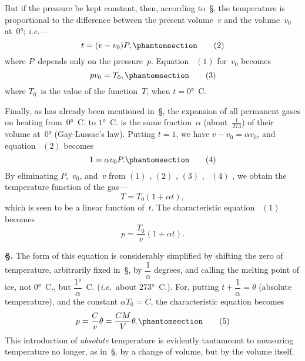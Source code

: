 \documentclass[12pt]{book}[2005/09/16]
\newcommand{\Chg}[2]{#2}
\newcommand{\Add}[1]{\Chg{}{#1}}
\newcommand{\Section}[1]{
  \medskip\par\textbf{§\;#1}
  \label{section:#1}
}
\newcommand{\SecRef}[2][§\;]{\hyperref[section:#2.]{{\upshape #1#2}}}
\newcommand{\Tag}[1]{%
  \phantomsection\label{eqn:#1}\tag*{\ensuremath{#1}}%
}
\newcommand{\Eq}[1]{%
  \hyperref[eqn:#1]{\ensuremath{#1}}%
}
\newcommand{\PageSep}[1]{\ignorespaces}
\newcommand{\ie}{\emph{i.e.}}
\begin{document}
But if the pressure be kept constant, then, according to~\SecRef{3},
the temperature is proportional to the difference between
the present volume~$v$ and the volume~$v_{0}$ at~$0°$; \ie---
\[
t = (v - v_{0})P,
\Tag{(2)}
\]
where $P$~depends only on the pressure~$p$. Equation~\Eq{(1)} for~$v_{0}$
becomes
\[
pv_{0} = T_{0},
\Tag{(3)}
\]
where $T_{0}$~is the value of the function~$T$, when $t = 0°$~C\@.

Finally, as has already been mentioned in~\SecRef{4}, the
expansion of all permanent gases on heating from~$0°$~C. to
$1°$~C. is the same fraction~$\alpha$ (about~$\frac{1}{273}$) of their volume at~$0°$
\PageSep{6}
(Gay-Lussac's law). Putting $t = 1$, we have $v - v_{0} = \alpha v_{0}$,
%
and equation~\Eq{(2)} becomes
%
\[
1 = \alpha v_{0} P\Add{.}
\Tag{(4)}
\]
By eliminating $P$,~$v_{0}$, and~$v$ from \Eq{(1)}, \Eq{(2)}, \Eq{(3)},~\Eq{(4)}, we obtain
the temperature function of the gas---
%
\[
T = T_{0} (1 + \alpha t),
\]
which is seen to be a linear function of~$t$. The characteristic
equation~\Eq{(1)} becomes
\[
p = \frac{T_{0}}{v} (1 + \alpha t).
\]

\Section{10.} The form of this equation is considerably simplified
by shifting the zero of temperature, arbitrarily fixed in~\SecRef{3},
by $\dfrac{1}{\alpha}$ degrees, and calling the melting point of ice, not $0°$~C.,
but $\dfrac{1°}{\alpha}$~C. (\ie\ about $273°$~C.). For, putting $t + \dfrac{1}{\alpha} = \theta$
(absolute temperature), and the constant $\alpha T_{0} = C$, the
%
characteristic equation becomes
%
\[
p = \frac{C}{v} \theta = \frac{CM}{V} \theta\Add{.}
\Tag{(5)}
\]
This introduction of \emph{absolute} temperature is evidently tantamount
to measuring temperature no longer, as in~\SecRef{3}, by a
change of volume, but by the volume itself.
\end{document}
